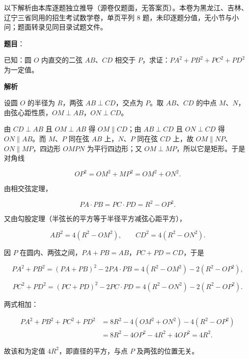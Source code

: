 

\begin{gktip}
以下解析由本库逐题独立推导（源卷仅题面，无答案页）。本卷为黑龙江、吉林、辽宁三省同用的招生考试数学卷，单页平列 8 题，未印逐题分值，无小节与小问；题面转录见同目录试题文件。
\end{gktip}

\begin{answer}

\textbf{题目}：

已知：圆 $O$ 内直交的二弦 $AB$、$CD$ 相交于 $P$，求证：$PA^{2}+PB^{2}+PC^{2}+PD^{2}$ 为一定值。

\textbf{解析}

设圆 $O$ 的半径为 $R$，两弦 $AB\perp CD$，交点为 $P$。取 $AB$、$CD$ 的中点 $M$、$N$，由弦心距性质，$OM\perp AB$，$ON\perp CD$。

由 $CD\perp AB$ 且 $OM\perp AB$ 得 $OM\parallel CD$；由 $AB\perp CD$ 且 $ON\perp CD$ 得 $ON\parallel AB$。而 $M$、$P$ 同在弦 $AB$ 上，$N$、$P$ 同在弦 $CD$ 上，故 $OM\parallel NP$、$ON\parallel MP$，四边形 $OMPN$ 为平行四边形；又 $OM\perp MP$，所以它是矩形。于是对角线

\nopagebreak[4]
\[
OP^{2}=OM^{2}+MP^{2}=OM^{2}+ON^{2}.
\]

由相交弦定理，

\nopagebreak[4]
\[
PA\cdot PB=PC\cdot PD=R^{2}-OP^{2}.
\]

又由勾股定理（半弦长的平方等于半径平方减弦心距平方），

\nopagebreak[4]
\[
AB^{2}=4\left(R^{2}-OM^{2}\right),\qquad CD^{2}=4\left(R^{2}-ON^{2}\right).
\]

因 $P$ 在圆内、两弦之间，$PA+PB=AB$，$PC+PD=CD$，于是

\nopagebreak[4]
\[
PA^{2}+PB^{2}=(PA+PB)^{2}-2PA\cdot PB=4(R^{2}-OM^{2})-2(R^{2}-OP^{2}),
\]

\nopagebreak[4]
\[
PC^{2}+PD^{2}=(PC+PD)^{2}-2PC\cdot PD=4(R^{2}-ON^{2})-2(R^{2}-OP^{2}).
\]

两式相加：

\nopagebreak[4]
\[
\begin{aligned}
PA^{2}+PB^{2}+PC^{2}+PD^{2}
&=8R^{2}-4(OM^{2}+ON^{2})-4(R^{2}-OP^{2})\\
&=8R^{2}-4OP^{2}-4R^{2}+4OP^{2}=4R^{2}.
\end{aligned}
\]

故该和为定值 $4R^{2}$，即直径的平方，与点 $P$ 及两弦的位置无关。


\end{answer}

